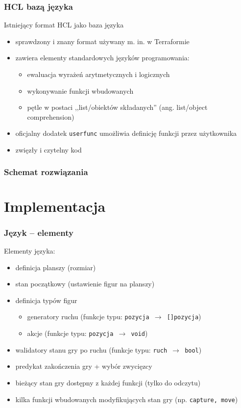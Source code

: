 \documentclass{beamer}
\begin{document}
\begin{frame}
	\frametitle{HCL bazą języka}
	Istniejący format HCL jako baza języka
	\begin{itemize}
		\item sprawdzony i znany format używany m. in. w Terraformie\footnotemark
		\item zawiera elementy standardowych języków programowania:
		      \begin{itemize}
			      \item ewaluacja wyrażeń arytmetycznych i logicznych
			      \item wykonywanie funkcji wbudowanych
			      \item pętle w postaci ,,list/obiektów składanych'' (ang. list/object comprehension)
		      \end{itemize}
		\item oficjalny dodatek {\tt userfunc} umożliwia definicję funkcji przez użytkownika
		\item zwięzły i czytelny kod
	\end{itemize}
\end{frame}

\begin{frame}
	\frametitle{Schemat rozwiązania}
\end{frame}


\section{Implementacja}

\begin{frame}
	\frametitle{Język -- elementy}
	Elementy języka:
	\begin{itemize}
		\item definicja planszy (rozmiar)
		\item stan początkowy (ustawienie figur na planszy)
		\item definicja typów figur
		      \begin{itemize}
			      \item generatory ruchu (funkcje typu: {\tt pozycja $\rightarrow$ []pozycja})
			      \item akcje (funkcje typu: {\tt pozycja $\rightarrow$ void})
		      \end{itemize}
		\item walidatory stanu gry po ruchu (funkcje typu: {\tt ruch $\rightarrow$ bool})
		\item predykat zakończenia gry + wybór zwycięzcy
		\item bieżący stan gry dostępny z każdej funkcji (tylko do odczytu)
		\item kilka funkcji wbudowanych modyfikujących stan gry (np. {\tt capture, move})
	\end{itemize}
\end{frame}
\end{document}
